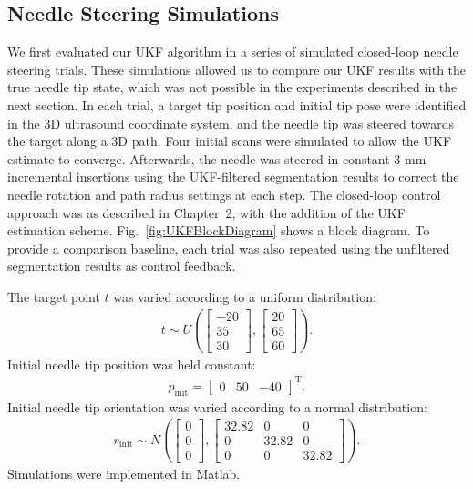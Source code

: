 \subsection{Needle Steering Simulations}
We first evaluated our UKF algorithm in a series of simulated closed-loop needle steering trials. These simulations allowed us to compare our UKF results with the true needle tip state, which was not possible in the experiments described in the next section. In each trial, a target tip position and initial tip pose were identified in the 3D ultrasound coordinate system, and the needle tip was steered towards the target along a 3D path. Four initial scans were simulated to allow the UKF estimate to converge. Afterwards, the needle was steered in constant 3-mm incremental insertions using the UKF-filtered segmentation results to correct the needle rotation and path radius settings at each step. The closed-loop control approach was as described in Chapter~2, with the addition of the UKF estimation scheme. Fig.~\ref{fig:UKFBlockDiagram} shows a block diagram. To provide a comparison baseline, each trial was also repeated using the unfiltered segmentation results as control feedback. 

The target point ${t}$ was varied according to a uniform distribution:
\begin{align}
{t} \sim U\left(
\begin{bmatrix} -20\\ 35\\ 30 \end{bmatrix},
\begin{bmatrix} 20\\ 65\\ 60 \end{bmatrix} \right).
\end{align}
Initial needle tip position was held constant: 
\begin{align*}
{p_{\text{init}}} = \begin{bmatrix} 0 & 50 & -40 \end{bmatrix}^{\text{T}}.
\end{align*}
Initial needle tip orientation was varied according to a normal distribution:
\begin{align}
{r_{\text{init}}} \sim N\left(
\begin{bmatrix} 0\\ 0\\ 0 \end{bmatrix},
\begin{bmatrix} 32.82 & 0 & 0\\ 0 & 32.82 & 0\\ 0 & 0 & 32.82 \end{bmatrix} \right).
\end{align}
Simulations were implemented in Matlab.

